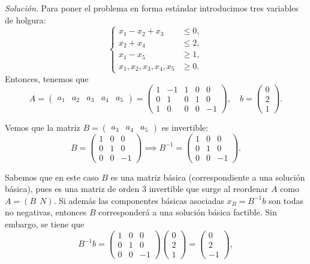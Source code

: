 \documentclass[11pt,a4paper]{article}
\begin{document}
\textit{Solución}. Para poner el problema en forma estándar introducimos tres variables de holgura:
        \[
        \begin{cases}
          x_{1} - x_{2} + x_3 &\leq 0,\\
          x_{2} + x_4&\leq 2,\\
          x_{1} - x_5&\geq 1,\\
          x_{1}, x_{2}, x_3, x_4, x_5 &\geq 0.
          \end{cases}
        \]
  Entonces, tenemos que
  \[
  A=\begin{pmatrix}
            a_1 & a_2 & a_3 & a_4 & a_5
        \end{pmatrix}=\begin{pmatrix}
          1& -1 & 1 & 0 & 0\\
          0 & 1 & 0 & 1 & 0\\
          1 & 0 & 0 & 0 & -1
      \end{pmatrix}, \quad b=\begin{pmatrix}
        0\\ 2\\1
    \end{pmatrix}.
  \]

  Vemos que la  matriz $B = \begin{pmatrix} a_{3} & a_{4} & a_{5} \end{pmatrix}$ es invertible:
  \[
B = \begin{pmatrix}
  1&0&0\\
  0&1&0\\
  0&0&-1
\end{pmatrix} \implies B^{-1}=\begin{pmatrix}
  1&0&0\\
  0&1&0\\
  0&0&-1
\end{pmatrix}.
  \]

Sabemos que en este caso $B$ es una matriz básica (correspondiente a una solución básica), pues es una matriz de orden $3$ invertible que surge al reordenar $A$ como $A=(B \ \ N)$. Si además las componentes básicas asociadas $x_B=B^{-1}b$ son todas no negativas, entonces $B$ corresponderá a una solución básica factible. Sin embargo, se tiene que
  \[
  B^{-1}b=\begin{pmatrix}
  1&0&0\\
  0&1&0\\
  0&0&-1
\end{pmatrix}\begin{pmatrix}
        0\\ 2\\1
    \end{pmatrix}=\begin{pmatrix}
    0\\2\\-1
  \end{pmatrix},
  \]
\end{document}
